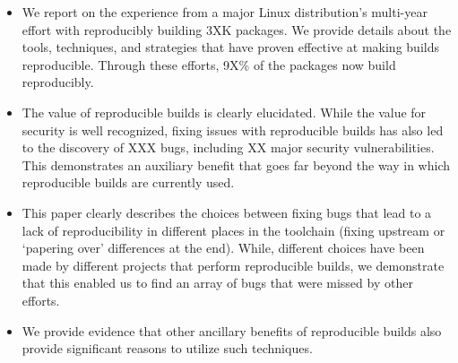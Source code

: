 \begin{itemize}
\item We report on the experience from a major Linux distribution's
multi-year effort with reproducibly building 3XK packages.  We provide
details about the tools, techniques, and strategies that have proven
effective at making builds reproducible.  Through these efforts, 9X\% of 
the packages now build reproducibly.

\item The value of reproducible builds is clearly elucidated.  While the
value for security is well recognized, fixing issues with reproducible
builds has also led to the discovery of XXX bugs, including XX major
security vulnerabilities.  This demonstrates an auxiliary benefit that goes
far beyond the way in which reproducible builds are currently used.

\item This paper clearly describes the choices between fixing bugs that
lead to a lack of reproducibility in different places in the toolchain
(fixing upstream or `papering over' differences at the end).
While, different choices have been made by different projects that perform 
reproducible builds, we demonstrate that this enabled us to find an array
of bugs that were missed by other efforts.

\item We provide evidence that other ancillary benefits of reproducible
builds also provide significant reasons to utilize such techniques.  

\end{itemize}



